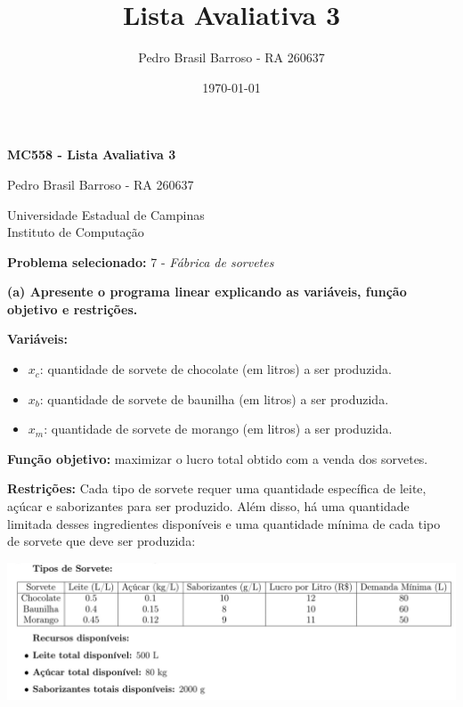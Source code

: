 \documentclass[
    12pt,
    a4paper,
    brazil,
    english
]{article}
\title{Lista Avaliativa 3}
\author{Pedro Brasil Barroso - RA 260637}
\date{\today} %
\begin{document}
\begin{titlepage}
    \centering

    \vspace*{6cm}

    {\LARGE \textbf{MC558 - Lista Avaliativa 3}}
    
    \vspace{5.5cm}
    {\Large Pedro Brasil Barroso - RA 260637}

    \vfill

    {\Large Universidade Estadual de Campinas} \\ %
    {\Large Instituto de Computação} \\

    \vspace{1cm}
\end{titlepage}

\textbf{Problema selecionado:} 7 - \textit{Fábrica de sorvetes}

\vspace{0.5cm}

\textbf{(a) Apresente o programa linear explicando as variáveis, função objetivo e restrições.}

\vspace{0.5cm}

\textbf{Variáveis:}

\begin{itemize}
    \item $x_c$: quantidade de sorvete de chocolate (em litros) a ser produzida.
    \item $x_b$: quantidade de sorvete de baunilha (em litros) a ser produzida.
    \item $x_m$: quantidade de sorvete de morango (em litros) a ser produzida.
\end{itemize}

\textbf{Função objetivo:} maximizar o lucro total obtido com a venda dos sorvetes.

\textbf{Restrições:} Cada tipo de sorvete requer uma quantidade específica de leite, açúcar e saborizantes para ser produzido. Além disso, há uma quantidade limitada desses ingredientes disponíveis e uma quantidade mínima de cada tipo de sorvete que deve ser produzida:

\includegraphics[scale=0.4]{image.png}
\end{document}
